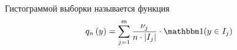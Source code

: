 \begin{comment}
Вспомним формулу \eqref{eq:cdfn_difference}
\begin{align*}
  \cdfn{a_j}&-\cdfn{a_{j-1}}= \\
  &= \frac{1}{n}\cdot \sum_{k=1}^n
  \left[\indicator{x_k\le a_j}-\indicator{x_k\le a_{j-1}}\right]
\end{align*}

Очевидно, что нас интересуют те пары, разность которых не равна нулю.
Это значит, что те случаи, когда $x>a_j$ или $x\le a_{j-1}$, нас не интересуют.
Поскольку такой случай, что $a_j<x\le a_{j-1}$ невозможен, то его тоже отбросим.
Значит, остался только тот вариант,
когда $x$ попадает в полуинтервал $\left(a_{j-1},a_j\right]$
$$\frac{1}{n}\cdot \sum_{k=1}^n
    \left[\indicator{x_k\le a_j}-\indicator{x_k\le a_{j-1}}\right]
  = \frac{1}{n}\cdot \sum_{k=1}^n \indicator{x_k\in \left(a_{j-1},a_j\right]}
$$

Видим знакомые полуинтервалы $\left(a_{j-1},a_j\right]=I_j$. Воспользуемся этим
$$\frac{1}{n}\cdot \sum_{k=1}^n \indicator{x_k\in \left(a_{j-1},a_j\right]}
= \frac{1}{n}\cdot \sum_{k=1}^n \indicator{x_k\in I_j}$$

Получаем компактную запись для разности функций распределения
\begin{equation}\label{eq:cdfn_difference_final}
\cdfn{a_j}-\cdfn{a_{j-1}}
= \frac{1}{n}\cdot \sum_{k=1}^n \indicator{x_k\in I_j}
\end{equation}


Вернёмся к уравнению \eqref{eq:histogram_start}
$$
q_n\left(y\right)
= \sum_{j=1}^m \frac{\cdfn{a_j}-\cdfn{a_{j-1}}}{a_j-a_{j-1}}
  \cdot \indicator{y\in I_j}
  $$

Воспользовавшись тем,
что $\left(a_j-a_{j-1}\right)$ --- длина полуинтервала $I_j$,
а разность $\cdfn{a_j}-\cdfn{a_{j-1}}$ была только что переписана
через индикаторы, получаем такую формулу
\begin{equation}\label{eq:histogramPreFinal}
  q_n\left(y\right)
    = \sum_{j=1}^m\frac{1}{n}\sum_{k=1}^n
      \indicator{x_k\in I_j}\cdot \frac{1}{\left|I_j\right|}
      \cdot \indicator{y \in I_j}
\end{equation}
\end{comment}
\begin{definition}[Гистограмма]
  Гистограммой выборки \xsample называется функция
  \begin{equation*}
    q_n\left(y\right)
    = \sum_{j=1}^m \frac{\nu_j}{n \cdot \left|I_j\right|}
      \cdot \indicator{y\in I_j}
  \end{equation*}
\end{definition}

